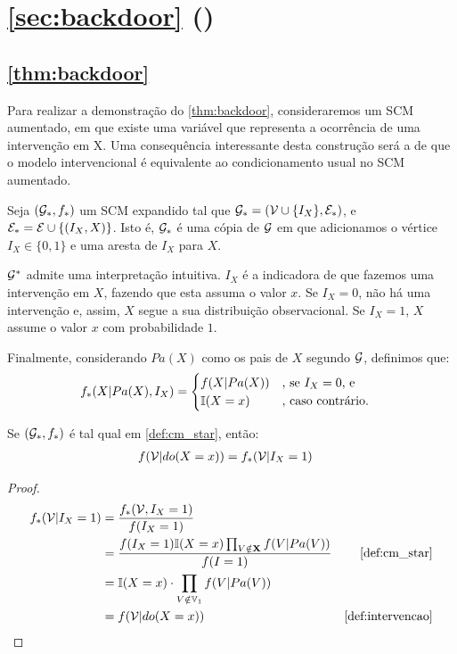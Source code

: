 \section{\cref{sec:backdoor} ()}

\subsection{\cref{thm:backdoor}}

Para realizar a demonstração do \cref{thm:backdoor},
consideraremos um SCM aumentado, 
em que existe uma variável que representa
a ocorrência de uma intervenção em X.
Uma consequência interessante desta construção será
a de que o modelo intervencional é equivalente
ao condicionamento usual no SCM aumentado.

\begin{definition}
 \label{def:cm_star}
 Seja $({\mathcal G}_*, f_*)$ um SCM expandido tal que
 ${\mathcal G}_* = ({\mathcal V} \cup \{I_X\}, {\mathcal E}_*)$, e
 ${\mathcal E}_* = {\mathcal E} \cup \{(I_X,X)\}$.
 Isto é, ${\mathcal G}_*$ é uma cópia de ${\mathcal G}$ em que
 adicionamos o vértice $I_X \in \{0,1\}$ e 
 uma aresta de $I_X$ para $X$.
 
 ${\mathcal G}^*$ admite uma interpretação intuitiva.
 $I_X$ é a indicadora de que fazemos uma intervenção em $X$,
 fazendo que esta assuma o valor $x$.
 Se $I_X = 0$, não há uma intervenção e, assim,
 $X$ segue a sua distribuição observacional.
 Se $I_X = 1$, $X$ assume o valor $x$ com probabilidade $1$.
 
 Finalmente, considerando $Pa(X)$ como os
 pais de $X$ segundo ${\mathcal G}$, definimos que:
 \begin{align*}
  f_*(X|Pa(X), I_X) 
  &= \begin{cases}
   f(X|Pa(X)) & \text{, se $I_X = 0$, e} \\
   {\mathbb I}(X = x) & \text{, caso contrário.}
  \end{cases}
 \end{align*}
\end{definition}

\begin{lemma}
 \label{lemma:backdoor_1}
 Se $({\mathcal G}_*, f_*)$ é tal qual em \cref{def:cm_star}, então:
 \begin{align*}
  f({\mathcal V}|do(X=x)) &= f_*({\mathcal V}|I_{X}=1)
 \end{align*}
\end{lemma}

\begin{proof}
 \begin{align*}
  f_*(\sV|I_{X} = 1) 
  &= \frac{f_*(\sV, I_{X}=1)}{f(I_{X}=1)} \\
  &= \frac{f(I_{X}=1)\I(X=x)\prod_{V \notin \X}f(V|Pa(V))}{f(I=1)}
  & \text{\cref{def:cm_star}} \\
  &= \I(X = x) \cdot \prod_{V \notin \V_1}f(V|Pa(V)) \\
  &= f(\sV|do(X=x)) 
  & \text{\cref{def:intervencao}}
 \end{align*}
\end{proof}

